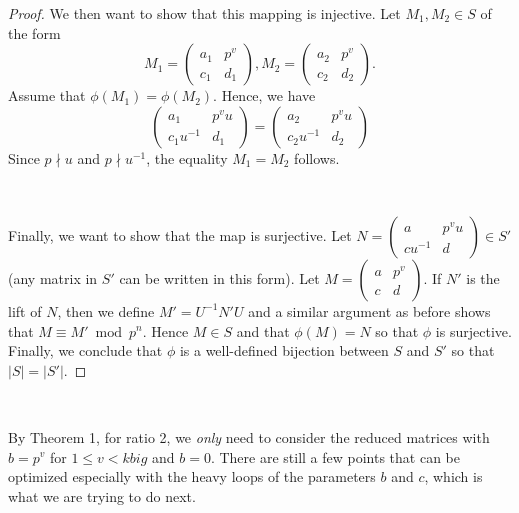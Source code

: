 \documentclass[letterpaper,12pt]{article}
\begin{document}
\begin{proof}
We then want to show that this mapping is injective.
Let $M_1, M_2 \in S$ of the form 
\[
M_1 = \begin{pmatrix}
a_1 & p^v \\ c_1 & d_1
\end{pmatrix}, 
M_2 = \begin{pmatrix}
a_2 & p^v \\ c_2 & d_2
\end{pmatrix}.
\]
Assume that $\phi(M_1) = \phi(M_2)$.
Hence, we have 
\[
\begin{pmatrix}
a_1 & p^v u \\ c_1u^{-1} & d_1
\end{pmatrix} = \begin{pmatrix}
a_2 & p^v u \\ c_2u^{-1} & d_2
\end{pmatrix}
\]  
Since $p \nmid u$ and $p \nmid u^{-1}$, the equality $M_1 = M_2$ follows.

\

Finally, we want to show that the map is surjective.
Let $N = \begin{pmatrix}
a & p^v u \\ cu^{-1} & d
\end{pmatrix} \in S'$ (any matrix in $S'$ can be written in this form).
Let $M = \begin{pmatrix}
a & p^v \\ c & d
\end{pmatrix}$.
If $N'$ is the lift of $N$, then we define 
$M' = U^{-1}N'U$ and a similar argument as before
shows that $M \equiv M' \bmod   p^n$.
Hence $M \in S$ and that $\phi(M) = N$ 
so that $\phi$ is surjective.
Finally, we conclude that $\phi$ is a well-defined bijection 
between $S$ and $S'$ so that $|S| = |S'|$.
\end{proof}

\

By Theorem 1, for ratio 2, we \emph{only} need to 
consider the reduced matrices with $b = p^v$ for $1 \leq v < kbig$ and $b = 0$.
There are still a few points that can be optimized especially with the heavy loops of 
the parameters $b$ and $c$, which is what we are trying to do next.

\
\end{document}
